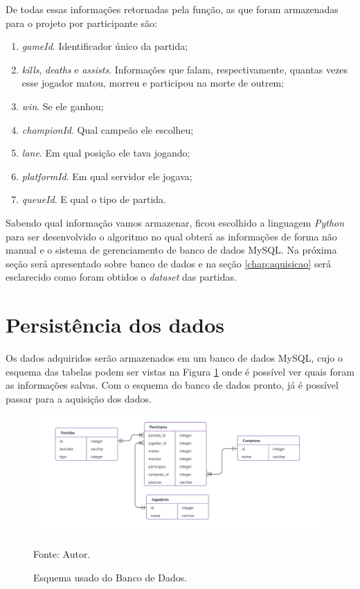De todas essas informações retornadas pela função, as que foram armazenadas para o projeto por participante são:

\begin{enumerate}
\item \textit{gameId}. Identificador único da partida;
\item \textit{kills}, \textit{deaths} e \textit{assists}. Informações que falam, respectivamente, quantas vezes esse jogador matou, morreu e participou na morte de outrem;
\item \textit{win}. Se ele ganhou;
\item \textit{championId}. Qual campeão ele escolheu;
\item \textit{lane}. Em qual posição ele tava jogando;
\item \textit{platformId}. Em qual servidor ele jogava;
\item \textit{queueId}. E qual o tipo de partida.
\end{enumerate}

Sabendo qual informação vamos armazenar, ficou escolhido a linguagem \textit{Python} para ser desenvolvido o algoritmo no qual obterá as informações de forma não manual e o sistema de gerenciamento de banco de dados MySQL. Na próxima seção será apresentado sobre banco de dados e na seção \ref{chap:aquisicao} será esclarecido como foram obtidos o \textit{dataset} das partidas. 


\section{Persistência dos dados}
Os dados adquiridos serão armazenados em um banco de dados MySQL, cujo o esquema das tabelas podem ser vistas na Figura \ref{fig:bd} onde é possível ver quais foram as informações salvas. Com o esquema do banco de dados pronto, já é possível passar para a aquisição dos dados.
\begin{figure}[H]
	\caption{Esquema usado do Banco de Dados.}
	\begin{center}
		\includegraphics[width=17cm]{imagens/esquema.png}
	\end{center}
	\small{Fonte: Autor.}
	\label{fig:bd}
\end{figure}


